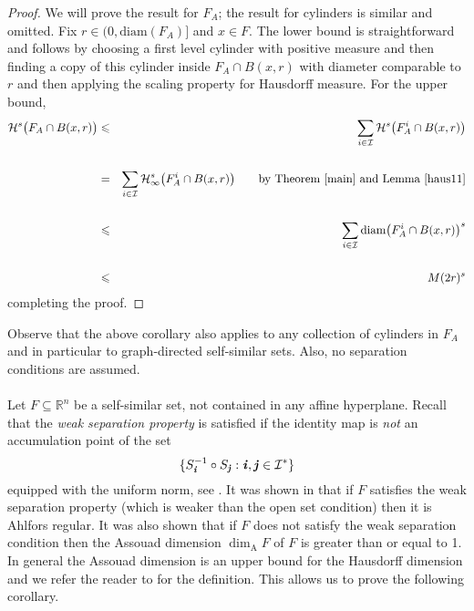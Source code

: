 \documentclass[11pt,english,british]{article}
\numberwithin{equation}{section}
\renewcommand{\leq}{\leqslant}
\begin{document}
\begin{proof}
We will prove the result for $F_A$; the result for cylinders is similar and omitted.  Fix $r \in (0, \text{diam}(F_A) ]$ and $x \in F$.  The lower bound is straightforward and follows by choosing a first level cylinder with positive measure and then finding a copy of this cylinder inside $F_A \cap B(x,r)$ with diameter comparable to $r$ and then applying the scaling property for Hausdorff measure.  For the upper bound,
\begin{eqnarray*}
\mathcal{H}^s\big( F_A \cap B(x,r) \big)  & \leq  & \sum_{i \in \mathcal{I}} \mathcal{H}^s\big( F^i_A \cap B(x,r) \big)  \\ \\
& =  & \sum_{i \in \mathcal{I}} \mathcal{H}_\infty^s\big( F^i_A \cap B(x,r) \big) \qquad  \text{by Theorem \ref{main} and Lemma \ref{haus11}}\\ \\
& \leq   & \sum_{i \in \mathcal{I}} \text{diam}\big( F^i_A \cap B(x,r) \big)^s \\ \\
& \leq   & M(2r)^s
\end{eqnarray*}
completing the proof.
\end{proof}
Observe that the above corollary also applies to any collection of cylinders in $F_A$ and in particular to graph-directed self-similar sets.  Also, no separation conditions are assumed.
\\ \\
Let $F \subseteq \mathbb{R}^n$ be a self-similar set, not contained in any affine hyperplane. Recall that the \emph{weak separation property} is satisfied if the identity map is \emph{not} an accumulation point of the set
\[
 \{ S_{\textbf{\textbf{\emph{i}}}}^{-1} \circ S_{\textbf{\emph{j}}} : \textbf{\textbf{\emph{i}}}, \textbf{\textbf{\emph{j}}} \in \mathcal{I}^* \}
\]
equipped with the uniform norm, see \cite{zerner}.  It was shown in \cite[Theorem 2.1]{assouadoverlaps} that if $F$ satisfies the weak separation property (which is weaker than the open set condition) then it is Ahlfors regular.  It was also shown \cite[Theorem 1.4]{assouadoverlaps} that if $F$ does not satisfy the weak separation condition then the Assouad dimension $\dim_\text{A} F$ of $F$ is greater than or equal to 1.  In general the Assouad dimension is an upper bound for the Hausdorff dimension and we refer the reader to \cite{assouadoverlaps} for the definition.  This allows us to prove the following corollary.
\end{document}
